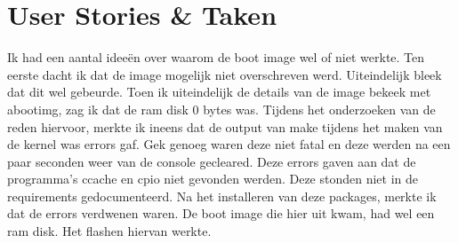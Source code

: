 \documentclass[a4paper]{report}
\newcommand{\enablerstorycolor}{SkyBlue1}
\begin{document}
\section{User Stories \& Taken}
\begin{tcolorbox}[colback=white, coltitle=black, colframe=\enablerstorycolor, title=\textbf{Enabler Story: }Als developer wil ik een werkende build server\, zodat er gemakkelijk en snel SailfishOS builds gemaakt kunnen worden.]
  Ik had een aantal ideeën over waarom de boot image wel of niet werkte. Ten eerste dacht ik dat de image mogelijk niet overschreven werd.
  Uiteindelijk bleek dat dit wel gebeurde. Toen ik uiteindelijk de details van de image bekeek met abootimg, zag ik dat de ram disk 0 bytes was.
  Tijdens het onderzoeken van de reden hiervoor, merkte ik ineens dat de output van make tijdens het maken van de kernel was errors gaf.
  Gek genoeg waren deze niet fatal en deze werden na een paar seconden weer van de console gecleared. 
  Deze errors gaven aan dat de programma's ccache en cpio niet gevonden werden. Deze stonden niet in de requirements gedocumenteerd.
  Na het installeren van deze packages, merkte ik dat de errors verdwenen waren. De boot image die hier uit kwam, had wel een ram disk.
  Het flashen hiervan werkte.


\end{tcolorbox}
\end{document}

